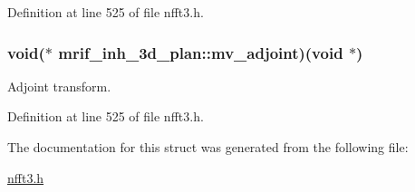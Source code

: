 Definition at line 525 of file nfft3.\-h.

\hypertarget{structmrif__inh__3d__plan_ac765b0a8797a3fd31b58133be9ff280b}{
\subsubsection[{mv\-\_\-adjoint}]{\setlength{\rightskip}{0pt plus 5cm}void($\ast$ mrif\-\_\-inh\-\_\-3d\-\_\-plan\-::mv\-\_\-adjoint)(void $\ast$)}}\label{structmrif__inh__3d__plan_ac765b0a8797a3fd31b58133be9ff280b}


Adjoint transform. 



Definition at line 525 of file nfft3.\-h.



The documentation for this struct was generated from the following file\-:\begin{DoxyCompactItemize}
\item 
\hyperlink{nfft3_8h}{nfft3.\-h}\end{DoxyCompactItemize}
